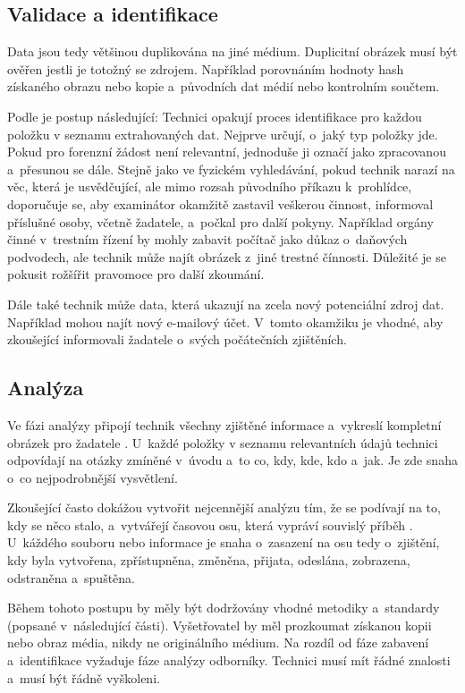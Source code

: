 \documentclass[thesis=B,czech]{FITthesis}[2012/06/26]
\begin{document}
\subsection{Validace a identifikace}

Data jsou tedy většinou duplikována na jiné médium. Duplicitní obrázek musí být ověřen jestli je totožný se zdrojem. Například porovnáním hodnoty hash získaného obrazu nebo kopie a~původních dat médií nebo kontrolním součtem.


Podle \cite{carroll2008computer} je postup následující: Technici opakují proces identifikace pro každou položku v seznamu extrahovaných dat. Nejprve určují, o~jaký typ položky jde. Pokud pro forenzní žádost není relevantní, jednoduše ji označí jako zpracovanou a~přesunou se dále. Stejně jako ve fyzickém vyhledávání, pokud technik narazí na věc, která je usvědčující, ale mimo rozsah původního příkazu k~prohlídce, doporučuje se, aby examinátor okamžitě zastavil veškerou činnost, informoval příslušné osoby, včetně žadatele, a~počkal pro další pokyny. Například orgány činné v~trestním řízení by mohly zabavit počítač jako důkaz o~daňových podvodech, ale technik může najít obrázek z~jiné trestné čínnosti. Důležité je se pokusit rožšířit pravomoce pro další zkoumání.

Dále také technik může data, která ukazují na zcela nový potenciální zdroj dat. Například mohou najít nový e-mailový účet. V~tomto okamžiku je vhodné, aby zkoušející informovali žadatele o~svých počátečních zjištěních.

\subsection{Analýza}
Ve fázi analýzy připojí technik všechny zjištěné informace a~vykreslí kompletní obrázek pro žadatele \cite{carroll2008computer}. U~každé položky v seznamu relevantních údajů technici odpovídají na otázky zmíněné v~úvodu a~to co, kdy, kde, kdo a~jak. Je zde snaha o~co nejpodrobnější vysvětlení.

Zkoušející často dokážou vytvořit nejcennější analýzu tím, že se podívají na to, kdy se něco stalo, a~vytvářejí časovou osu, která vypráví souvislý příběh \cite{carroll2008computer}. U~káždého souboru nebo informace je snaha o~zasazení na osu tedy o~zjištění, kdy byla vytvořena, zpřístupněna, změněna, přijata, odeslána, zobrazena, odstraněna a~spuštěna. 

Během tohoto postupu by měly být dodržovány vhodné metodiky a~standardy (popsané v~následující části)\cite{for_sez}. Vyšetřovatel by měl prozkoumat získanou kopii nebo obraz média, nikdy ne originálního médium. Na rozdíl od fáze zabavení a~identifikace vyžaduje fáze analýzy odborníky. Technici musí mít řádné znalosti a~musí být řádně vyškoleni. 
\end{document}
